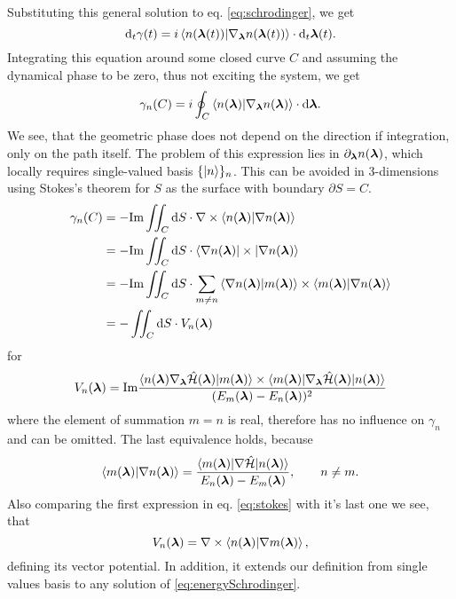 Substituting this general solution to eq. \ref{eq:schrodinger}, we get
\begin{equation}
    \mathrm{d}_t \gamma(t)=i\braket{n({\bm\lambda}(t))|\nabla_{\bm\lambda} n({\bm\lambda}(t))}\cdot \mathrm{d}_t {\bm\lambda}(t).
\end{equation}
Integrating this equation around some closed curve $C$ and assuming the dynamical phase to be zero, thus not exciting the system, we get
\begin{equation}
    \gamma_n(C)=i\oint_C\braket{n({\bm\lambda})|\nabla_{\bm\lambda} n({\bm\lambda})}\cdot \mathrm{d} {\bm\lambda}.
    \label{eq:gammaCoint}
\end{equation}
We see, that the geometric phase does not depend on the direction if integration, only on the path itself. The problem of this expression lies in $\partial_{\bm\lambda} n({\bm\lambda})$, which locally requires single-valued basis $\{\ket{n}\}_n$. This can be avoided in 3-dimensions using Stokes's theorem for $S$ as the surface with boundary $\partial S=C$.
\begin{equation}
    \begin{split}
        \gamma_n(C) &= -\textrm{Im} \iint_C \mathrm{d} S \cdot \nabla \times \braket{n({\bm\lambda})|\nabla n({\bm\lambda})}\\
         &= -\textrm{Im} \iint_C \mathrm{d} S \cdot \braket{\nabla n({\bm\lambda})|\times|\nabla n({\bm\lambda})}\\
        &= -\textrm{Im} \iint_C \mathrm{d} S \cdot \sum_{m\neq n} \braket{\nabla n({\bm\lambda})|m({\bm\lambda})}\times \braket{m({\bm\lambda})|\nabla n({\bm\lambda})}\\
        &= -\iint_C \mathrm{d} S \cdot V_n({\bm\lambda})
            \label{eq:stokes}
    \end{split}
\end{equation}
for 
\begin{equation}
    V_n({\bm\lambda}) = \textrm{Im} \frac{
            \braket{n({\bm\lambda})\nabla_{\bm\lambda} \hat{\mathcal{H}}({\bm\lambda}) |m({\bm\lambda})}\times \braket{m({\bm\lambda})|\nabla_{\bm\lambda} \hat{\mathcal{H}}({\bm\lambda})|n({\bm\lambda})}    
             }{
(E_m({\bm\lambda})-E_n({\bm\lambda}))^2
            }
\end{equation}
where the element of summation $m=n$ is real, therefore has no influence on $\gamma_n$ and can be omitted. The last equivalence holds, because
\begin{equation}
    \braket{m({\bm\lambda})|\nabla n({\bm\lambda})}=
    \frac{\braket{m({\bm\lambda})|\nabla \hat{\mathcal{H}} |n({\bm\lambda})}}
    { E_n({\bm\lambda})-E_m({\bm\lambda})}, \qquad n\neq m.
\end{equation}
Also comparing the first expression in eq. \ref{eq:stokes} with it's last one we see, that
\begin{equation}
    V_n({\bm\lambda})=\nabla\times\braket{n({\bm\lambda})|\nabla m({\bm\lambda})}, 
    \label{eq:vectorPotentialDef}  
\end{equation}
defining its vector potential. In addition, it extends our definition from single values basis to any solution of \ref{eq:energySchrodinger}.


